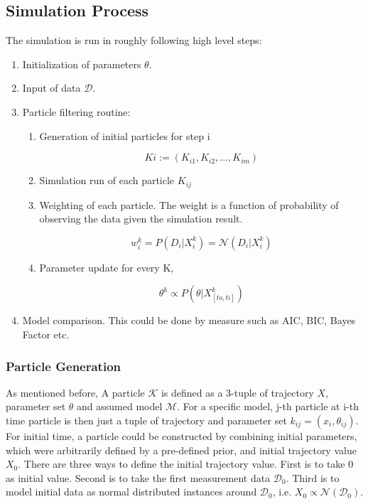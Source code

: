 \documentclass[12pt, oneside]{article}
\begin{document}
\subsection{Simulation Process}

The simulation is run in roughly following high level steps:

\begin{enumerate}
\item Initialization of parameters $\theta$.
\item Input of data $\mathcal{D}$.
\item Particle filtering routine:

\begin{enumerate}
\item Generation of initial particles for step i

$$Ki := (K_{i1}, K_{i2}, \dots, K_{im})$$

\item Simulation run of each particle $K_{ij}$
\item Weighting of each particle. The weight is a function of probability of observing the data given the simulation result.

$$w_i^k = P(D_i | X_i^k) = \mathcal{N}(D_i | X_i^k)$$

\item Parameter update for every K,

$$\theta^k \propto P(\theta | X^k_{[to, ti]})$$
\end{enumerate}

\item Model comparison. This could be done by measure such as AIC, BIC, Bayes Factor etc.

\end{enumerate}

\subsubsection{Particle Generation}

As mentioned before, A particle $\mathcal{K}$ is defined as a 3-tuple of trajectory $X$, parameter set $\theta$ and assumed model $\mathcal{M}$. For a specific model, j-th particle at i-th time particle is then just a tuple of trajectory and parameter set $k_{ij} = (x_i, \theta_{ij})$.\\

For initial time, a particle could be constructed by combining initial parameters, which were arbitrarily defined by a pre-defined prior, and initial trajectory value $X_0$. There are three ways to define the initial trajectory value. First is to take 0 as initial value. Second is to take the first measurement data $\mathcal{D}_0$. Third is to model initial data as normal distributed instances around $\mathcal{D}_0$, i.e. $X_0 \propto \mathcal{N}(\mathcal{D}_0)$.\\
\end{document}
